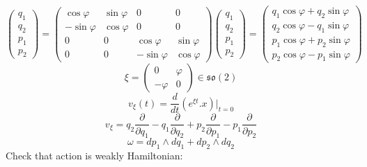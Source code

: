 \documentclass[12pt]{article}
\theoremstyle{definition}
\begin{document}
\begin{enumerate}
\begin{itemize}
\begin{equation}
\begin{pmatrix}
                q_1\\
                q_2\\
                p_1\\
                p_2
            \end{pmatrix}=\begin{pmatrix}
                \cos\varphi & \sin\varphi & 0 & 0\\
                -\sin\varphi & \cos\varphi & 0 & 0\\
                0 & 0 & \cos\varphi & \sin\varphi\\
                0 & 0 & -\sin\varphi & \cos\varphi
            \end{pmatrix}\begin{pmatrix}
                q_1\\
                q_2\\
                p_1\\
                p_2
            \end{pmatrix}=\begin{pmatrix}
                q_1\cos\varphi+q_2\sin\varphi\\
                q_2\cos\varphi-q_1\sin\varphi\\
                p_1\cos\varphi+p_2\sin\varphi\\
                p_2\cos\varphi-p_1\sin\varphi
            \end{pmatrix}
        \end{equation}
        \begin{equation}
            \xi=\begin{pmatrix}
                0 & \varphi\\
                -\varphi & 0
            \end{pmatrix}\in\mathfrak{so}(2)
        \end{equation}
        \begin{equation}
            v_\xi(t)=\frac{d}{dt}(e^{\xi t}.x)|_{t=0}
        \end{equation}
        \begin{equation}
            v_\xi=q_2\frac{\partial}{\partial q_1}-q_1\frac{\partial}{\partial q_2}+p_2\frac{\partial}{\partial p_1}-p_1\frac{\partial}{\partial p_2}
        \end{equation}
        \begin{equation}
            \omega=dp_1\wedge dq_1+dp_2\wedge dq_2
        \end{equation}
        Check that action is weakly Hamiltonian:

\end{itemize}
\end{enumerate}
\end{document}
